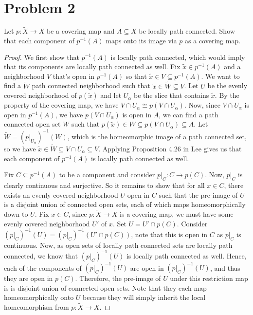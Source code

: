 \documentclass[11pt]{article} %
\newcommand{\wt}{\widetilde}
\begin{document}
\section*{Problem 2}
Let $p:\wt{X}\to X$ be a covering map and $A\subseteq X$ be locally path connected. Show that each component of $p^{-1}(A)$ maps onto its image via $p$ as a covering map.

\begin{proof}
We first show that $p^{-1}(A)$ is locally path connected, which would imply that its components are locally path connected as well. Fix $\wt{x}\in p^{-1}(A)$ and a neighborhood $V$ that's open in $p^{-1}(A)$ so that $\wt{x}\in V \subseteq p^{-1}(A)$. We want to find a $\wt{W}$ path connected neighborhood such that $\wt{x}\in \wt{W}\subseteq V$. Let $U$ be the evenly covered neighborhood of $p(\wt{x})$ and let $U_\alpha$ be the slice that contains $\wt{x}$. By the property of the covering map, we have $V\cap U_\alpha \cong p(V\cap U_\alpha)$. Now, since $V\cap U_\alpha$ is open in $p^{-1}(A)$, we have $p(V\cap U_\alpha)$ is open in $A$, we can find a path connected open set $W$ such that $p(\wt{x})\in W\subseteq p(V\cap U_\alpha)\subseteq A$. Let $\wt{W} = \left(p\big|_{U_\alpha}\right)^{-1}(W)$, which is the homeomorphic image of a path connected set, so we have $\wt{x}\in \wt{W}\subseteq V\cap U_\alpha \subseteq V$. Applying Proposition 4.26 in Lee gives us that each component of $p^{-1}(A)$ is locally path connected as well.

Fix $C\subseteq p^{-1}(A)$ to be a component and consider $p\big|_C:C\to p(C)$. Now, $p\big|_C$ is clearly continuous and surjective. So it remains to show that for all $x\in C$, there exists an evenly covered neighborhood $U$ open in $C$ such that the pre-image of $U$ is a disjoint union of connected open sets, each of which maps homeomorphically down to $U$. Fix $x\in C$, since $p:\wt{X}\to X$ is a covering map, we must have some evenly covered neighborhood $U'$ of $x$. Set $U = U'\cap p(C)$. Consider $\left(p\big|_C\right)^{-1}(U) = \left(p\big|_C\right)^{-1}(U'\cap p(C))$, note that this is open in $C$ as $p\big|_C$ is continuous. Now, as open sets of locally path connected sets are locally path connected, we know that $\left(p\big|_C\right)^{-1}(U)$ is locally path connected as well. Hence, each of the components of $\left(p\big|_C\right)^{-1}(U)$ are open in $\left(p\big|_C\right)^{-1}(U)$, and thus they are open in $p(C)$. Therefore, the pre-image of $U$ under this restriction map is is disjoint union of connected open sets. Note that they each map homeomorphically onto $U$ because they will simply inherit the local homeomorphism from $p:\wt{X}\to X$.
\end{proof}
\end{document}
